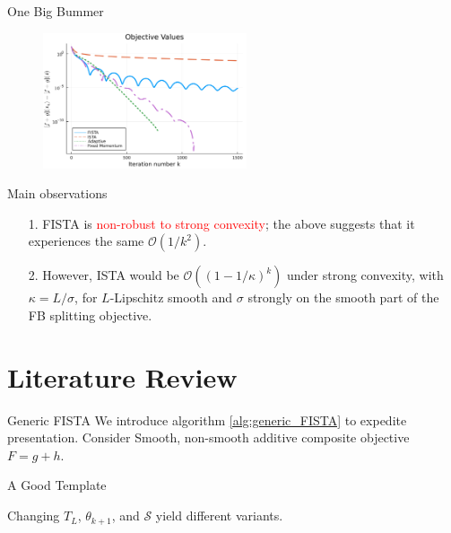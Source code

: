 \documentclass[11pt]{beamer}
\theoremstyle{definition}
\begin{document}
    \begin{frame}{One Big Bummer}
        \begin{figure}
            \includegraphics[width=6cm]{Assets/obj_vals.png}
        \end{figure}
        Main observations
        \begin{itemize}
            \item [1.] FISTA is \textcolor{red}{non-robust to strong convexity}; the above suggests that it experiences the same $\mathcal O (1/k^2)$. 
            \item [2.] However, ISTA would be $\mathcal O((1 - 1/\kappa)^k)$ under strong convexity, with $\kappa = L/\sigma$, for $L$-Lipschitz smooth and $\sigma$ strongly on the smooth part of the FB splitting objective. 
        \end{itemize}
    \end{frame}
        
\section{Literature Review}
    \begin{frame}{Generic FISTA}
        We introduce algorithm \ref*{alg:generic_FISTA} to expedite presentation. Consider Smooth, non-smooth additive composite objective $F = g + h$. 
        \begin{block}{A Good Template}
            \begin{algorithm}[H]
                \begin{algorithmic}[1]
                    \ENDFOR
                \end{algorithmic}
                \caption{Generic FISTA}
                \label{alg:generic_FISTA}
            \end{algorithm}
        \end{block}
        Changing $T_L$, $\theta_{k + 1}$, and $\mathcal S$ yield different variants. 
    \end{frame}
\end{document}
